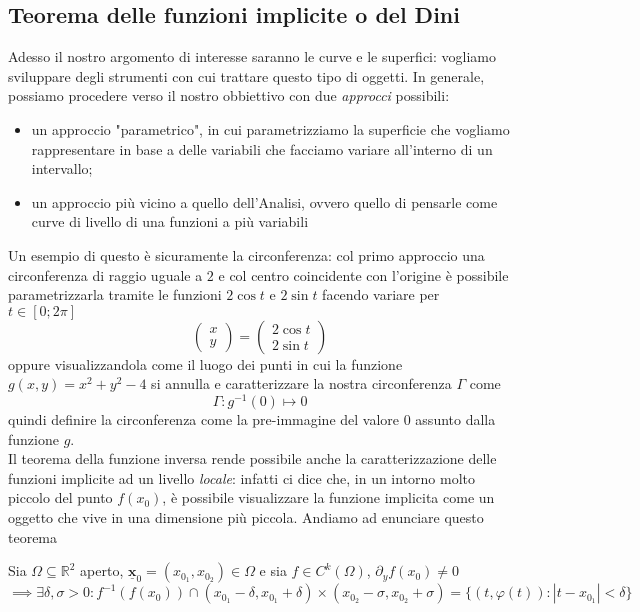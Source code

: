 \begin{theorem}
\section{Teorema delle funzioni implicite o del Dini}
Adesso il nostro argomento di interesse saranno le curve e le superfici: vogliamo sviluppare degli strumenti con cui trattare questo tipo di oggetti. In generale, possiamo procedere verso il nostro obbiettivo con due \emph{approcci} possibili:
\begin{itemize}
	\item un approccio "parametrico", in cui parametrizziamo la superficie che vogliamo rappresentare in base a delle variabili che facciamo variare all'interno di un intervallo;
	\item un approccio più vicino a quello dell'Analisi, ovvero quello di pensarle come curve di livello di una funzioni a più variabili
\end{itemize}
Un esempio di questo è sicuramente la circonferenza: col primo approccio una circonferenza di raggio uguale a $2$ e col centro coincidente con l'origine è possibile parametrizzarla tramite le funzioni $2\cos{t}$ e $2\sin{t}$ facendo variare per $t \in [0; 2\pi]$
$$
\begin{pmatrix}
	x \\
	y
\end{pmatrix} = \begin{pmatrix}
	2\cos{t} \\
	2\sin{t}
\end{pmatrix}
$$
oppure visualizzandola come il luogo dei punti in cui la funzione $g(x, y) = x^2 + y^2 - 4$ si annulla e caratterizzare la nostra circonferenza $\Gamma$ come
$$
\Gamma : g^{-1}(0) \mapsto 0
$$
quindi definire la circonferenza come la pre-immagine del valore $0$ assunto dalla funzione $g$. \\
Il teorema della funzione inversa rende possibile anche la caratterizzazione delle funzioni implicite ad un livello \emph{locale}: infatti ci dice che, in un intorno molto piccolo del punto $f(x_0)$, è possibile visualizzare la funzione implicita come un oggetto che vive in una dimensione più piccola. Andiamo ad enunciare questo teorema
\begin{theorem}
Sia $\Omega \subseteq \mathbb{R}^2$ aperto, $\bm{\underline{x}}_0 = (x_{0_1}, x_{0_2}) \in \Omega$ e sia $f \in C^k (\Omega)$, $\partial_y f(x_0) \neq 0$
$$\implies \exists \delta, \sigma > 0 : f^{-1}(f(x_0)) \cap (x_{0_1}-\delta, x_{0_1}+\delta) \times (x_{0_2} - \sigma, x_{0_2}+\sigma) = \{(t, \varphi(t)) : |t-x_{0_1}| < \delta \}$$

\end{theorem}
\end{theorem}
